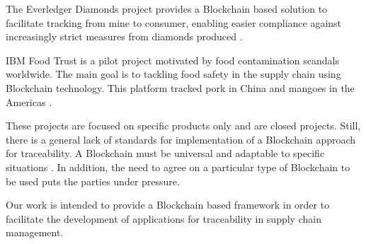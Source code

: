 The Everledger Diamonds project provides a Blockchain based solution to facilitate tracking from mine to consumer, enabling easier compliance against increasingly strict measures from diamonds produced \cite{crosby2016blockchain}.

IBM Food Trust is a pilot project motivated by food contamination scandals worldwide. The main goal is to tackling food safety in the supply chain using Blockchain technology. This platform tracked pork in China and mangoes in the Americas \cite{kamath2018food}.

These projects are focused on specific products only and are closed projects. Still, there is a general lack of standards for implementation of a Blockchain approach for traceability. A Blockchain must be universal and adaptable to specific situations \cite{valenta2017comparison}. In addition, the need to agree on a particular type of Blockchain to be used puts the parties under pressure. 

Our work is intended to provide a Blockchain based framework in order to facilitate the development of applications for traceability in supply chain management.